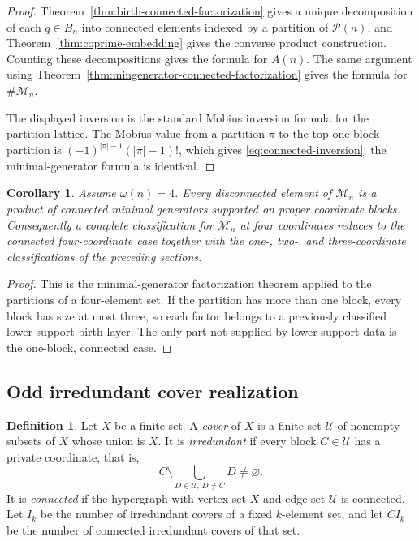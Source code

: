 \documentclass[11pt,letterpaper]{article}
\numberwithin{equation}{section}
\theoremstyle{plain}
\newtheorem{corollary}[theorem]{Corollary}
\theoremstyle{definition}
\newtheorem{definition}[theorem]{Definition}
\theoremstyle{remark}
\begin{document}
\begin{proof}
Theorem~\ref{thm:birth-connected-factorization} gives a unique decomposition
of each \(q\in B_n\) into connected elements indexed by a partition of
\(\mathcal P(n)\), and Theorem~\ref{thm:coprime-embedding} gives the converse
product construction. Counting these decompositions gives the formula for
\(A(n)\). The same argument using
Theorem~\ref{thm:mingenerator-connected-factorization} gives the formula for
\(\#\mathcal M_n\).

The displayed inversion is the standard Mobius inversion formula for the
partition lattice. The Mobius value from a partition \(\pi\) to the top
one-block partition is
\((-1)^{|\pi|-1}(|\pi|-1)!\), which gives
\eqref{eq:connected-inversion}; the minimal-generator formula is identical.
\end{proof}

\begin{corollary}\label{cor:four-support-reduction}
Assume \(\omega(n)=4\). Every disconnected element of \(\mathcal M_n\) is a
product of connected minimal generators supported on proper coordinate blocks.
Consequently a complete classification for \(\mathcal M_n\) at four
coordinates reduces to the connected four-coordinate case together with the
one-, two-, and three-coordinate classifications of the preceding sections.
\end{corollary}

\begin{proof}
This is the minimal-generator factorization theorem applied to the partitions
of a four-element set. If the partition has more than one block, every block
has size at most three, so each factor belongs to a previously classified
lower-support birth layer. The only part not supplied by lower-support data is
the one-block, connected case.
\end{proof}

\subsection*{Odd irredundant cover realization}

\begin{definition}\label{def:irredundant-covers}
Let \(X\) be a finite set. A \emph{cover} of \(X\) is a finite set
\(\mathcal U\) of nonempty subsets of \(X\) whose union is \(X\). It is
\emph{irredundant} if every block \(C\in\mathcal U\) has a private coordinate,
that is,
\[
C\setminus\bigcup_{D\in\mathcal U,\,D\ne C}D\ne\varnothing.
\]
It is \emph{connected} if the hypergraph with vertex set \(X\) and edge set
\(\mathcal U\) is connected. Let \(I_k\) be the number of irredundant covers of
a fixed \(k\)-element set, and let \(CI_k\) be the number of connected
irredundant covers of that set.
\end{definition}
\end{document}
